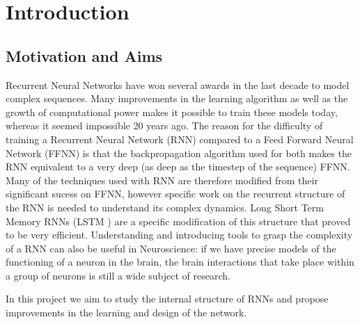 
\chapter{Introduction} %

\label{Chapter 1} %




\section{Motivation and Aims}
Recurrent Neural Networks have won several awards in the last decade to model complex sequences. Many improvements in the learning algorithm as well as the growth of computational power makes it possible to train these models today, whereas it seemed impossible 20 years ago. The reason for the difficulty of training a Recurrent Neural Network (RNN) compared to a Feed Forward Neural Network (FFNN) is that the backpropagation algorithm used for both makes the RNN equivalent to a very deep (as deep as the timestep of the sequence) FFNN. Many of the techniques used with RNN are therefore modified from their significant sucess on FFNN, however specific work on the recurrent structure of the RNN is needed to understand its complex dynamics. Long Short Term Memory RNNs (LSTM \cite{hochreiter1997long}) are a specific modification of this structure that proved to be very efficient. Understanding and introducing tools to grasp the complexity of a RNN can also be useful in Neuroscience: if we have precise models of the functioning of a neuron in the brain, the brain interactions that take place within a group of neurons is still a wide subject of research.   

In this project we aim to study the internal structure of RNNs and propose improvements in the learning and design of the network.

